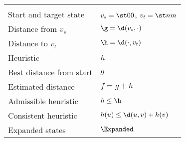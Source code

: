 \begin{tabular}[H]{ll}
  \midrule
  \textbf{\A} & \\
  \tabindent Start and target state & $v_s = \st 00$, $v_t = \st nm$ \\
  \tabindent Distance from $v_s$ & $\g = \d(v_s, \cdot)$\\
  \tabindent Distance to $v_t$& $\h = \d(\cdot, v_t)$\\
  \tabindent Heuristic & $h$\\
  \tabindent Best distance from start & $g$  \\
  \tabindent Estimated distance & $f = g + h$\\
  \tabindent Admissible heuristic & $h \leq \h$\\
  \tabindent Consistent heuristic & $h(u) \leq \d(u,v) + h(v)$\\
  \tabindent Expanded states & $\Expanded$\\
  \bottomrule
\end{tabular}

